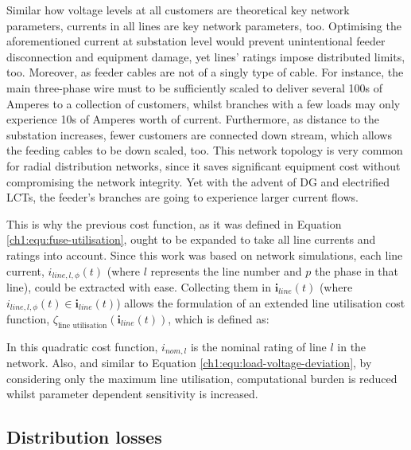 Similar how voltage levels at all customers are theoretical key network parameters, currents in all lines are key network parameters, too.
Optimising the aforementioned current at substation level would prevent unintentional feeder disconnection and equipment damage, yet lines' ratings impose distributed limits, too.
Moreover, as feeder cables are not of a singly type of cable.
For instance, the main three-phase wire must to be sufficiently scaled to deliver several 100s of Amperes to a collection of customers, whilst branches with a few loads may only experience 10s of Amperes worth of current.
Furthermore, as distance to the substation increases, fewer customers are connected down stream, which allows the feeding cables to be down scaled, too.
This network topology is very common for radial distribution networks, since it saves significant equipment cost without compromising the network integrity.
Yet with the advent of DG and electrified LCTs, the feeder's branches are going to experience larger current flows.

This is why the previous cost function, as it was defined in Equation \ref{ch1:equ:fuse-utilisation}, ought to be expanded to take all line currents and ratings into account.
Since this work was based on network simulations, each line current, $i_{line,l,\phi}(t)$ (where $l$ represents the line number and $p$ the phase in that line), could be extracted with ease.
Collecting them in $\textbf{i}_{line}(t)$ (where $i_{line,l,\phi}(t) \in \textbf{i}_{line}(t)$) allows the formulation of an extended line utilisation cost function, $\zeta_\text{line utilisation}(\textbf{i}_{line}(t))$, which is defined as:



In this quadratic cost function, $i_{nom,l}$ is the nominal rating of line $l$ in the network.
Also, and similar to Equation \ref{ch1:equ:load-voltage-deviation}, by considering only the maximum line utilisation, computational burden is reduced whilst parameter dependent sensitivity is increased.

\subsection{Distribution losses}
\label{ch1:subsec:losses}


